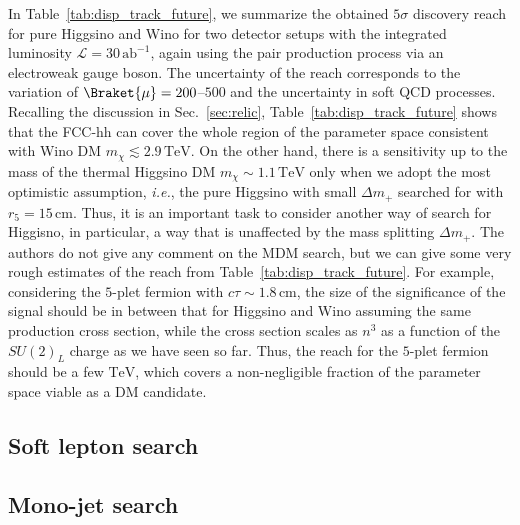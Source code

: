 \documentclass[12pt,twoside,book]{article}
\begin{document}
In Table~\ref{tab:disp_track_future}, we summarize the obtained $5\sigma$ discovery reach for pure Higgsino and Wino for two detector setups with the integrated luminosity $\mathcal{L} = 30\,\mathrm{ab}^{-1}$, again using the pair production process via an electroweak gauge boson.
The uncertainty of the reach corresponds to the variation of $\Braket{\mu}=200$--$500$ and the uncertainty in soft QCD processes.
Recalling the discussion in Sec.~\ref{sec:relic}, Table~\ref{tab:disp_track_future} shows that the FCC-hh can cover the whole region of the parameter space consistent with Wino DM $m_\chi \lesssim 2.9\,\mathrm{TeV}$.
On the other hand, there is a sensitivity up to the mass of the thermal Higgsino DM $m_\chi \sim 1.1\,\mathrm{TeV}$ only when we adopt the most optimistic assumption, \textit{i.e.}, the pure Higgsino with small $\Delta m_{+}$ searched for with $r_5 = 15\,\mathrm{cm}$.
Thus, it is an important task to consider another way of search for Higgisno, in particular, a way that is unaffected by the mass splitting $\Delta m_{+}$.
The authors do not give any comment on the MDM search, but we can give some very rough estimates of the reach from Table~\ref{tab:disp_track_future}.
For example, considering the $5$-plet fermion with $c\tau \sim 1.8\,\mathrm{cm}$, the size of the significance of the signal should be in between that for Higgsino and Wino assuming the same production cross section, while the cross section scales as $n^3$ as a function of the $SU(2)_L$ charge as we have seen so far.
Thus, the reach for the $5$-plet fermion should be a few $\mathrm{TeV}$, which covers a non-negligible fraction of the parameter space viable as a DM candidate.


\subsection{Soft lepton search}
\label{sec:soft_lepton}



\subsection{Mono-jet search}
\label{sec:mono-jet}
\end{document}
